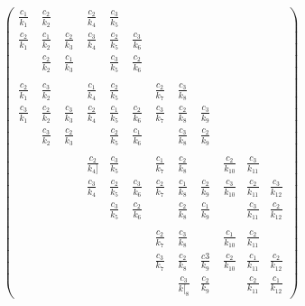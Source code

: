 \documentclass[revised,endfloat]{geophysics}
\begin{document}
\begin{equation}
\begin{pmatrix}
\frac{c_1}{k_1} & \frac{c_2}{k_2} & \quad & \frac{c_2}{k_4} & \frac{c_3}{k_5} & \quad & \quad & \quad & \quad & \quad & \quad & \quad \\

\frac{c_2}{k_1} & \frac{c_1}{k_2} & \frac{c_2}{k_3} & \frac{c_3}{k_4} & \frac{c_2}{k_5} & \frac{c_3}{k_6}  & \quad & \quad & \quad & \quad & \quad & \quad \\

\quad & \frac{c_2}{k_2} & \frac{c_1}{k_3} & \quad & \frac{c_3}{k_5} & \frac{c_2}{k_6}  & \quad & \quad & \quad & \quad & \quad & \quad \\\\

\frac{c_2}{k_1} & \frac{c_3}{k_2}  & \quad & \frac{c_1}{k_4}  & \frac{c_2}{k_5} & \quad   & \frac{c_2}{k_7} & \frac{c_3}{k_8} & \quad & \quad & \quad & \quad \\

\frac{c_3}{k_1} & \frac{c_2}{k_2} & \frac{c_3}{k_3} & \frac{c_2}{k_4} & \frac{c_1}{k_5} & \frac{c_2}{k_6} & \frac{c_3}{k_7} & \frac{c_2}{k_8} & \frac{c_3}{k_9} & \quad & \quad & \quad \\

\quad & \frac{c_3}{k_2} & \frac{c_2}{k_3} &  \quad & \frac{c_2}{k_5} & \frac{c_1}{k_6} &  \quad & \frac{c_3}{k_8} & \frac{c_2}{k_9} &  \quad &  \quad &  \quad \\\\

\quad & \quad &\quad & \frac{c_2}{k_4]} & \frac{c_3}{k_5} & \quad & \frac{c_1}{k_7} & \frac{c_2}{k_8} & \quad & \frac{c_2}{k_{10}} & \frac{c_3}{k_{11}} & \quad \\

\quad  & \quad  & \quad & \frac{c_3}{k_4} & \frac{c_2}{k_5} & \frac{c_3}{k_6} & \frac{c_2}{k_7}  & \frac{c_1}{k_8} & \frac{c_2}{k_9}  & \frac{c_3}{k_{10}} & \frac{c_2}{k_{11}} & \frac{c_3}{k_{12}} \\

\quad &  \quad &  \quad &  \quad & \frac{c_3}{k_5} & \frac{c_2}{k_6} &  \quad & \frac{c_2}{k_8} & \frac{c_1}{k_9} &  \quad & \frac{c_3}{k_{11}} & \frac{c_2}{k_{12}} \\\\

\quad &  \quad &  \quad & \quad & \quad & \quad & \frac{c_2}{k_7} & \frac{c_3}{k_8} & \quad & \frac{c_1}{k_{10}} & \frac{c_2}{k_{11}} & \quad \\
 
\quad &  \quad &  \quad & \quad & \quad & \quad & \frac{c_3}{k_7} & \frac{c_2}{k_8} & \frac{c3}{k_9} & \frac{c_2}{k_{10}} & \frac{c_1}{k_{11}} & \frac{c_2}{k_{12}} \\

\quad &  \quad &  \quad & \quad & \quad & \quad & \quad & \frac{c_3}{k[_8} & \frac{c_2}{k_9} & \quad & \frac{c_2}{k_{11}} & \frac{c_1}{k_{12}} 
\end{pmatrix}
\end{equation}
\end{document}
